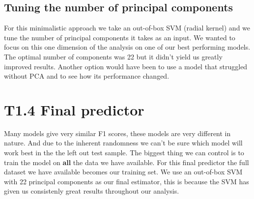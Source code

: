 \documentclass{article}
\begin{document}
\subsection*{Tuning the number of principal components}
For this minimalistic approach we take an out-of-box SVM (radial kernel) and we tune the number of principal components it takes as an input.
We wanted to focus on this one dimension of the analysis on one of our best performing models. The optimal number of components was 22 
but it didn't yield us greatly improved results. Another option would have been to use a model that struggled without PCA and to see how its performance changed.


\section*{T1.4 Final predictor}
Many models give very similar F1 scores, these models are very different in nature. 
And due to the inherent randomness we can't be sure which model will work best in the the left out test sample.
The biggest thing we can control is to train the model on \textbf{all} the data we have available. 
For this final predictor the full dataset we have available becomes our training set.
We use an out-of-box SVM with 22 principal components as our final estimator, this is because the SVM has given us consistenly great results throughout our analysis.
\end{document}
